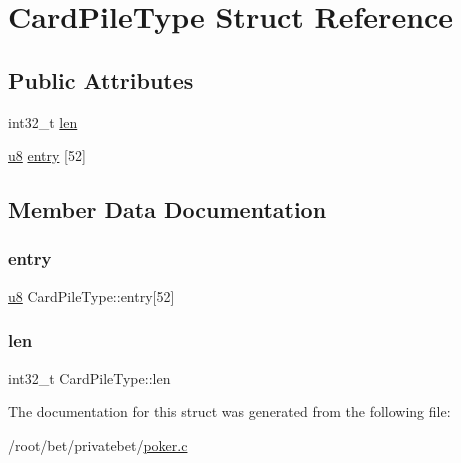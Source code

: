 \hypertarget{structCardPileType}{}\section{Card\+Pile\+Type Struct Reference}
\label{structCardPileType}
\subsection*{Public Attributes}
\begin{DoxyCompactItemize}
\item 
int32\+\_\+t \hyperlink{structCardPileType_a1eb13d658b445dd4fd8a27dd039d098a}{len}
\item 
\hyperlink{poker_8c_a92c50087ca0e64fa93fc59402c55f8ca}{u8} \hyperlink{structCardPileType_a10602423899018c878601a1a8d833257}{entry} \mbox{[}52\mbox{]}
\end{DoxyCompactItemize}


\subsection{Member Data Documentation}
\mbox{\label{structCardPileType_a10602423899018c878601a1a8d833257}} 
\subsubsection{\texorpdfstring{entry}{entry}}
{\footnotesize\ttfamily \hyperlink{poker_8c_a92c50087ca0e64fa93fc59402c55f8ca}{u8} Card\+Pile\+Type\+::entry\mbox{[}52\mbox{]}}

\mbox{\label{structCardPileType_a1eb13d658b445dd4fd8a27dd039d098a}} 
\subsubsection{\texorpdfstring{len}{len}}
{\footnotesize\ttfamily int32\+\_\+t Card\+Pile\+Type\+::len}



The documentation for this struct was generated from the following file\+:\begin{DoxyCompactItemize}
\item 
/root/bet/privatebet/\hyperlink{poker_8c}{poker.\+c}\end{DoxyCompactItemize}
